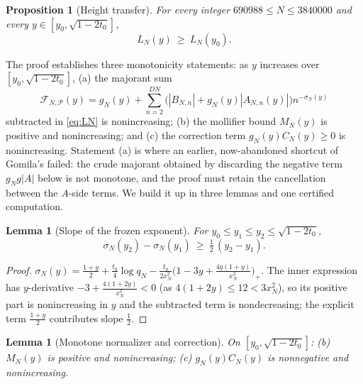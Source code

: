 \documentclass[11pt]{article}
\newtheorem{lemma}[theorem]{Lemma}
\newtheorem{proposition}[theorem]{Proposition}
\theoremstyle{definition}
\newcommand{\calP}{\mathcal{P}}
\begin{document}
\begin{proposition}[Height transfer]\label{prop:transfer}
For every integer $690988\le N\le3840000$ and every
$y\in[y_0,\sqrt{1-2t_0}]$,
\[
L_N(y)\ \ge\ L_N(y_0).
\]
\end{proposition}

The proof establishes three monotonicity statements: as $y$
increases over $[y_0,\sqrt{1-2t_0}]$, (a) the majorant sum
\[
\mathcal F_{N,\calP}(y)
=g_N(y)+\sum_{n=2}^{DN}
\bigl(|B_{N,n}|+g_N(y)|A_{N,n}(y)|\bigr)n^{-\sigma_N(y)}
\]
subtracted in \eqref{eq:LN} is nonincreasing; (b) the mollifier
bound $M_N(y)$ is positive and nonincreasing; and (c) the correction
term $g_N(y)C_N(y)\ge0$ is nonincreasing. Statement (a) is where an
earlier, now-abandoned shortcut of Gomila's failed: the crude
majorant obtained by discarding the negative term $g_N g|A|$ below
is not monotone, and the proof must retain the cancellation between
the $A$-side terms. We build it up in three lemmas and one certified
computation.

\begin{lemma}[Slope of the frozen exponent]\label{lem:sigmaslope}
For $y_0\le y_1\le y_2\le\sqrt{1-2t_0}$,
\[
\sigma_N(y_2)-\sigma_N(y_1)\ \ge\ \tfrac12\,(y_2-y_1).
\]
\end{lemma}

\begin{proof}
$\sigma_N(y)=\frac{1+y}2+\frac{t_0}4\log q_N
-\frac{t_0}{2x_N^2}\bigl(1-3y+\frac{4y(1+y)}{x_N^2}\bigr)_+$. The
inner expression has $y$-derivative $-3+\frac{4(1+2y)}{x_N^2}<0$
(as $4(1+2y)\le12<3x_N^2$), so its positive part is nonincreasing
in $y$ and the subtracted term is nondecreasing; the explicit term
$\frac{1+y}2$ contributes slope $\frac12$.
\end{proof}

\begin{lemma}[Monotone normalizer and correction]\label{lem:bc}
On $[y_0,\sqrt{1-2t_0}]$: \textup{(b)} $M_N(y)$ is positive and
nonincreasing; \textup{(c)} $g_N(y)C_N(y)$ is nonnegative and
nonincreasing.
\end{lemma}
\end{document}
